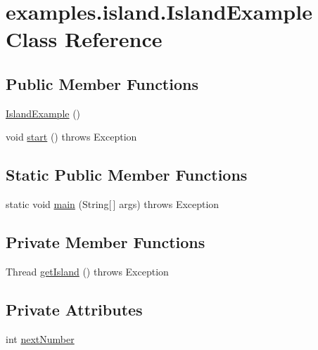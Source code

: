 \hypertarget{classexamples_1_1island_1_1_island_example}{\section{examples.\-island.\-Island\-Example Class Reference}
\label{classexamples_1_1island_1_1_island_example}
}
\subsection*{Public Member Functions}
\begin{DoxyCompactItemize}
\item 
\hyperlink{classexamples_1_1island_1_1_island_example_a64588955b06c3b9c8b38f88ef036bfab}{Island\-Example} ()
\item 
void \hyperlink{classexamples_1_1island_1_1_island_example_aad36c7af08e927224e83d83a04b104e1}{start} ()  throws Exception 
\end{DoxyCompactItemize}
\subsection*{Static Public Member Functions}
\begin{DoxyCompactItemize}
\item 
static void \hyperlink{classexamples_1_1island_1_1_island_example_a2fe3d60a9457c919ea4c9f952aee73d3}{main} (String\mbox{[}$\,$\mbox{]} args)  throws Exception 
\end{DoxyCompactItemize}
\subsection*{Private Member Functions}
\begin{DoxyCompactItemize}
\item 
Thread \hyperlink{classexamples_1_1island_1_1_island_example_aa7bb1c8c88c9af45e2a6bf2e3534315c}{get\-Island} ()  throws Exception 
\end{DoxyCompactItemize}
\subsection*{Private Attributes}
\begin{DoxyCompactItemize}
\item 
int \hyperlink{classexamples_1_1island_1_1_island_example_aad00699c42d3ffa5485898b13117e18c}{next\-Number}
\end{DoxyCompactItemize}
